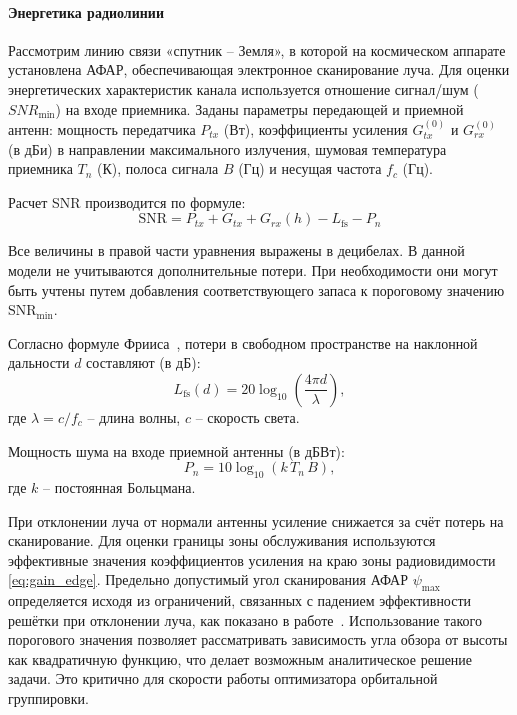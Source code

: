 \paragraph{Энергетика радиолинии}

Рассмотрим линию связи «спутник – Земля», 
в которой на космическом аппарате установлена АФАР, 
обеспечивающая электронное сканирование луча.
Для оценки энергетических характеристик канала используется 
отношение сигнал/шум ($SNR_{\min}$) на входе приемника.
Заданы параметры передающей и приемной антенн: 
мощность передатчика $P_{tx}$ (Вт), коэффициенты
усиления $G_{tx}^{(0)}$ и $G_{rx}^{(0)}$ (в дБи) в направлении
максимального излучения, шумовая температура приемника $T_n$ (К),
полоса сигнала $B$ (Гц) и несущая частота $f_c$ (Гц).

Расчет SNR производится по формуле:
\begin{equation}
\mathrm{SNR} = P_{tx} + G_{tx} + G_{rx}(h) - L_{\text{fs}} - P_{n}
\end{equation}

Все величины в правой части уравнения выражены в децибелах. 
В данной модели не учитываются дополнительные потери. При необходимости они могут быть учтены 
путем добавления соответствующего запаса к пороговому значению \(\mathrm{SNR}_{\min}\).

Согласно формуле Фрииса~\cite{friis1946}, потери в свободном
пространстве на наклонной дальности $d$ составляют (в дБ):
\begin{equation}\label{eq:fs_loss}
L_{\text{fs}}(d) = 20\log_{10}\!\left(\frac{4\pi d}{\lambda}\right),
\end{equation}
где $\lambda = c/f_c$ -- длина волны, $c$ -- скорость света.

Мощность шума на входе приемной антенны (в дБВт):
\begin{equation}
P_{n} = 10\log_{10}(k\,T_n\,B),
\end{equation}
где $k$ -- постоянная Больцмана.

При отклонении луча от нормали антенны усиление снижается за 
счёт потерь на сканирование. Для оценки границы зоны обслуживания 
используются эффективные значения коэффициентов усиления на краю 
зоны радиовидимости \eqref{eq:gain_edge}. Предельно допустимый угол 
сканирования АФАР $\psi_{\max}$ определяется исходя из ограничений, 
связанных с падением эффективности решётки при отклонении луча, 
как показано в работе~\cite{balanis2016}. 
Использование такого порогового значения позволяет рассматривать 
зависимость угла обзора от высоты как квадратичную функцию, 
что делает возможным аналитическое решение задачи. 
Это критично для скорости работы оптимизатора орбитальной группировки.

